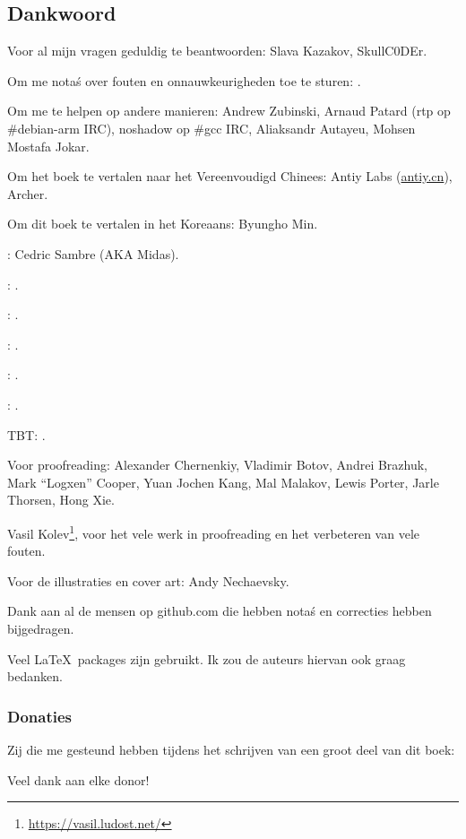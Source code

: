 \subsection*{Dankwoord}

Voor al mijn vragen geduldig te beantwoorden: Slava  Kazakov, SkullC0DEr.

Om me nota\'s over fouten en onnauwkeurigheden toe te sturen: \PeopleMistakesInaccuracies{}.

Om me te helpen op andere manieren:
Andrew Zubinski,
Arnaud Patard (rtp op \#debian-arm IRC),
noshadow op \#gcc IRC,
Aliaksandr Autayeu, Mohsen Mostafa Jokar.

Om het boek te vertalen naar het Vereenvoudigd Chinees:
Antiy Labs (\href{http://antiy.cn}{antiy.cn}), Archer.

Om dit boek te vertalen in het Koreaans: Byungho Min.

\NLph{}: Cedric Sambre (AKA Midas).

\NLph{}: \PeopleSpanishTranslators{}.

\NLph{}: \PeoplePTBRTranslators{}.

\NLph{}: \PeopleItalianTranslators{}.

\NLph{}: \PeopleFrenchTranslators{}.

\NLph{}: \PeopleGermanTranslators{}.

\ac{TBT}: \PeoplePolishTranslators{}.


Voor proofreading:
Alexander  Chernenkiy,
Vladimir Botov,
Andrei Brazhuk,
Mark ``Logxen'' Cooper, Yuan Jochen Kang, Mal Malakov, Lewis Porter, Jarle Thorsen, Hong Xie.

Vasil Kolev\footnote{\url{https://vasil.ludost.net/}}, voor het vele werk in proofreading en het verbeteren van vele fouten.

Voor de illustraties en cover art: Andy Nechaevsky.

Dank aan al de mensen op github.com die hebben nota\'s en correcties hebben bijgedragen\FNGithubContributors{}.

Veel \LaTeX\ packages zijn gebruikt. Ik zou de auteurs hiervan ook graag bedanken.

\subsubsection*{Donaties}

Zij die me gesteund hebben tijdens het schrijven van een groot deel van dit boek:



Veel dank aan elke donor!
